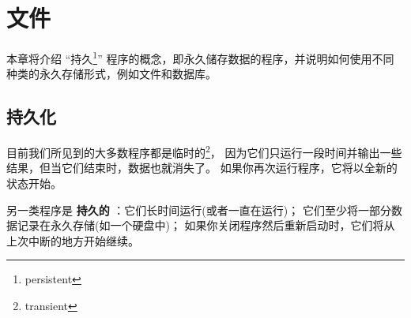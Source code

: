 

\chapter{文件}


本章将介绍 ``持久\footnote{persistent}'' 程序的概念，即永久储存数据的程序，并说明如何使用不同种类的永久存储形式，例如文件和数据库。

\section{持久化}

    


目前我们所见到的大多数程序都是临时的\footnote{transient}，
因为它们只运行一段时间并输出一些结果，但当它们结束时，数据也就消失了。
如果你再次运行程序，它将以全新的状态开始。


另一类程序是 {\bf 持久的} ：它们长时间运行(或者一直在运行)；
它们至少将一部分数据记录在永久存储(如一个硬盘中)；
如果你关闭程序然后重新启动时，它们将从上次中断的地方开始继续。


